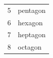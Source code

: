 {{\begin{center}
\begin{xtabular}[t]{|l|l|}
    
        5 &
    
    
        pentagon%
     \tabularnewline{}
    
    
        6 &
    
    
        hexagon%
     \tabularnewline{}
    
    
        7 &
    
    
        heptagon%
     \tabularnewline{}
    
    
        8 &
    
    
        octagon%
     \tabularnewline{}
    

\end{xtabular}
\end{center}}}
